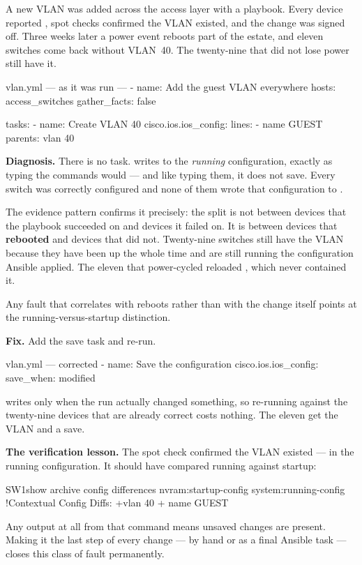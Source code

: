 \begin{breakfix}
A new VLAN was added across the access layer with a playbook. Every device
reported , spot checks confirmed the VLAN existed, and the change
was signed off. Three weeks later a power event reboots part of the estate, and
eleven switches come back without VLAN~40. The twenty-nine that did not lose
power still have it.

\begin{playbook}{vlan.yml --- as it was run}
---
- name: Add the guest VLAN everywhere
  hosts: access_switches
  gather_facts: false

  tasks:
    - name: Create VLAN 40
      cisco.ios.ios_config:
        lines:
          - name GUEST
        parents: vlan 40
\end{playbook}

\textbf{Diagnosis.} There is no  task.  writes to
the \emph{running} configuration, exactly as typing the commands would --- and
like typing them, it does not save. Every switch was correctly configured and
none of them wrote that configuration to .

The evidence pattern confirms it precisely: the split is not between devices that
the playbook succeeded on and devices it failed on. It is between devices that
\textbf{rebooted} and devices that did not. Twenty-nine switches still have the
VLAN because they have been up the whole time and are still running the
configuration Ansible applied. The eleven that power-cycled reloaded
, which never contained it.

Any fault that correlates with reboots rather than with the change itself points
at the running-versus-startup distinction.

\textbf{Fix.} Add the save task and re-run.

\begin{playbook}{vlan.yml --- corrected}
    - name: Save the configuration
      cisco.ios.ios_config:
        save_when: modified
\end{playbook}

 writes only when the run actually changed something,
so re-running against the twenty-nine devices that are already correct costs
nothing. The eleven get the VLAN and a save.

\textbf{The verification lesson.} The spot check confirmed the VLAN existed ---
in the running configuration. It should have compared running against startup:

\begin{verify}{SW1}{show archive config differences nvram:startup-config system:running-config}
!Contextual Config Diffs:
+vlan 40
+ name GUEST
\end{verify}

Any output at all from that command means unsaved changes are present. Making it
the last step of every change --- by hand or as a final Ansible task --- closes
this class of fault permanently.
\end{breakfix}

